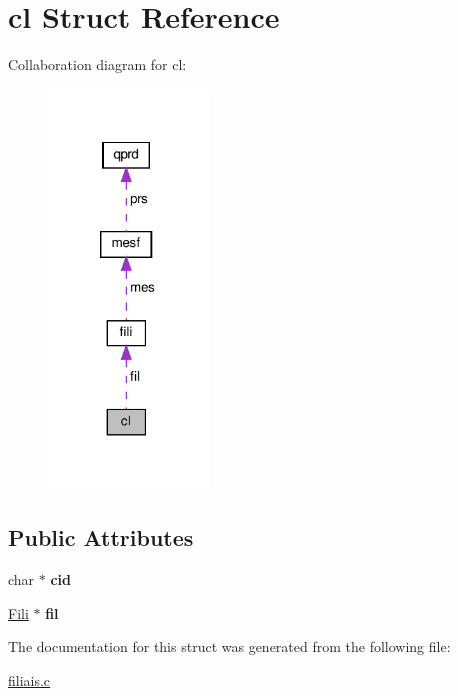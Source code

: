 \hypertarget{structcl}{}\section{cl Struct Reference}
\label{structcl}


Collaboration diagram for cl\+:
\nopagebreak
\begin{figure}[H]
\begin{center}
\leavevmode
\includegraphics[width=121pt]{structcl__coll__graph}
\end{center}
\end{figure}
\subsection*{Public Attributes}
\begin{DoxyCompactItemize}
\item 
\mbox{\label{structcl_a0387de3ebf25a3eca5713185b874d576}} 
char $\ast$ {\bfseries cid}
\item 
\mbox{\label{structcl_a01e86c9d03698621304fceb71c47866c}} 
\hyperlink{structfili}{Fili} $\ast$ {\bfseries fil}
\end{DoxyCompactItemize}


The documentation for this struct was generated from the following file\+:\begin{DoxyCompactItemize}
\item 
\hyperlink{filiais_8c}{filiais.\+c}\end{DoxyCompactItemize}
